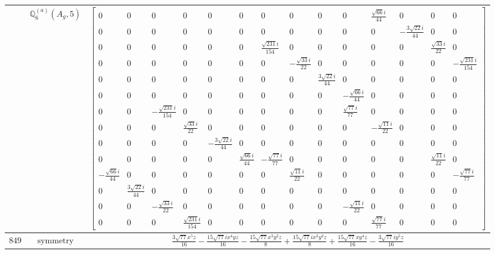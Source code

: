 \documentclass[fleqn,8pt,landscape]{jsarticle}
\begin{document}
\begin{longtable}{ccc}
$  $ & $ \mathbb{Q}_{6}^{(a)}(A_{g},5) $ & $ \begin{bmatrix} 0 & 0 & 0 & 0 & 0 & 0 & 0 & 0 & 0 & 0 & \frac{\sqrt{66} i}{44} & 0 & 0 & 0 \\ 0 & 0 & 0 & 0 & 0 & 0 & 0 & 0 & 0 & 0 & 0 & - \frac{3 \sqrt{22} i}{44} & 0 & 0 \\ 0 & 0 & 0 & 0 & 0 & 0 & \frac{\sqrt{231} i}{154} & 0 & 0 & 0 & 0 & 0 & \frac{\sqrt{33} i}{22} & 0 \\ 0 & 0 & 0 & 0 & 0 & 0 & 0 & - \frac{\sqrt{33} i}{22} & 0 & 0 & 0 & 0 & 0 & - \frac{\sqrt{231} i}{154} \\ 0 & 0 & 0 & 0 & 0 & 0 & 0 & 0 & \frac{3 \sqrt{22} i}{44} & 0 & 0 & 0 & 0 & 0 \\ 0 & 0 & 0 & 0 & 0 & 0 & 0 & 0 & 0 & - \frac{\sqrt{66} i}{44} & 0 & 0 & 0 & 0 \\ 0 & 0 & - \frac{\sqrt{231} i}{154} & 0 & 0 & 0 & 0 & 0 & 0 & \frac{\sqrt{77} i}{77} & 0 & 0 & 0 & 0 \\ 0 & 0 & 0 & \frac{\sqrt{33} i}{22} & 0 & 0 & 0 & 0 & 0 & 0 & - \frac{\sqrt{11} i}{22} & 0 & 0 & 0 \\ 0 & 0 & 0 & 0 & - \frac{3 \sqrt{22} i}{44} & 0 & 0 & 0 & 0 & 0 & 0 & 0 & 0 & 0 \\ 0 & 0 & 0 & 0 & 0 & \frac{\sqrt{66} i}{44} & - \frac{\sqrt{77} i}{77} & 0 & 0 & 0 & 0 & 0 & \frac{\sqrt{11} i}{22} & 0 \\ - \frac{\sqrt{66} i}{44} & 0 & 0 & 0 & 0 & 0 & 0 & \frac{\sqrt{11} i}{22} & 0 & 0 & 0 & 0 & 0 & - \frac{\sqrt{77} i}{77} \\ 0 & \frac{3 \sqrt{22} i}{44} & 0 & 0 & 0 & 0 & 0 & 0 & 0 & 0 & 0 & 0 & 0 & 0 \\ 0 & 0 & - \frac{\sqrt{33} i}{22} & 0 & 0 & 0 & 0 & 0 & 0 & - \frac{\sqrt{11} i}{22} & 0 & 0 & 0 & 0 \\ 0 & 0 & 0 & \frac{\sqrt{231} i}{154} & 0 & 0 & 0 & 0 & 0 & 0 & \frac{\sqrt{77} i}{77} & 0 & 0 & 0 \end{bmatrix} $ \\ \hline
$ 849 $ & $ \text{symmetry} $ & $ \frac{3 \sqrt{77} x^{5} z}{16} - \frac{15 \sqrt{77} i x^{4} y z}{16} - \frac{15 \sqrt{77} x^{3} y^{2} z}{8} + \frac{15 \sqrt{77} i x^{2} y^{3} z}{8} + \frac{15 \sqrt{77} x y^{4} z}{16} - \frac{3 \sqrt{77} i y^{5} z}{16} $ \\

\end{longtable}
\end{document}
